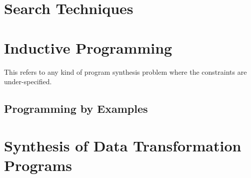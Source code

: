 
\section{Search Techniques}
\label{sec:search-techniques}




\section{Inductive Programming}
\label{sec:inductive-programming}

This refers to any kind of program synthesis problem where the constraints are
under-specified. 

\subsection{Programming by Examples}
\label{sec:pbe}

\section{Synthesis of Data Transformation Programs}
\label{sec:data-trans-synth}


